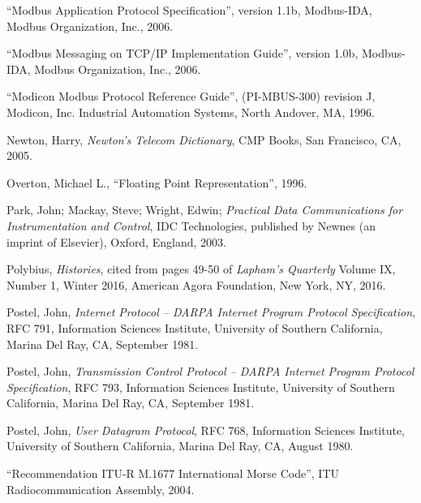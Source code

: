\vskip 10pt

\noindent
``Modbus Application Protocol Specification'', version 1.1b, Modbus-IDA, Modbus Organization, Inc., 2006. 

\vskip 10pt

\noindent
``Modbus Messaging on TCP/IP Implementation Guide'', version 1.0b, Modbus-IDA, Modbus Organization, Inc., 2006. 

\vskip 10pt

\noindent
``Modicon Modbus Protocol Reference Guide'', (PI-MBUS-300) revision J, Modicon, Inc. Industrial Automation Systems, North Andover, MA, 1996. 

\vskip 10pt

\noindent
Newton, Harry, \textit{Newton's Telecom Dictionary}, CMP Books, San Francisco, CA, 2005.

\vskip 10pt

\noindent
Overton, Michael L., ``Floating Point Representation'', 1996.

\vskip 10pt

\noindent
Park, John; Mackay, Steve; Wright, Edwin; \textit{Practical Data Communications for Instrumentation and Control}, IDC Technologies, published by Newnes (an imprint of Elsevier), Oxford, England, 2003.

\vskip 10pt

\noindent
Polybius, \textit{Histories}, cited from pages 49-50 of \textit{Lapham's Quarterly} Volume IX, Number 1, Winter 2016, American Agora Foundation, New York, NY, 2016.

\vskip 10pt

\noindent
Postel, John, \textit{Internet Protocol -- DARPA Internet Program Protocol Specification}, RFC 791, Information Sciences Institute, University of Southern California, Marina Del Ray, CA, September 1981.

\vskip 10pt

\noindent
Postel, John, \textit{Transmission Control Protocol -- DARPA Internet Program Protocol Specification}, RFC 793, Information Sciences Institute, University of Southern California, Marina Del Ray, CA, September 1981.

\vskip 10pt

\noindent
Postel, John, \textit{User Datagram Protocol}, RFC 768, Information Sciences Institute, University of Southern California, Marina Del Ray, CA, August 1980.

\vskip 10pt

\noindent
``Recommendation ITU-R M.1677 International Morse Code'', ITU Radiocommunication Assembly, 2004. 


